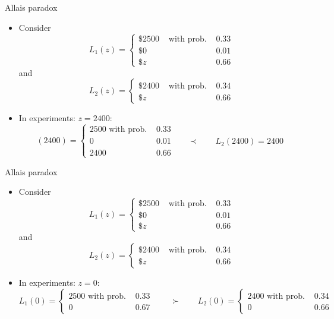 \begin{frame}[t]{Allais paradox}
\footnotesize
\begin{itemize}
\item Consider\[L_1(z)=\left\{\begin{array}{lll}\$ 2500 & \text { with prob. } & 0.33\\ \$0 & & 0.01 \\ \$ z & & 0.66\end{array}\right.\]
and
\[L_2(z)=\left\{\begin{array}{lll}\$ 2400 & \text { with prob. } & 0.34 \\ \$ z & & 0.66\end{array}\right.\]\medskip
\item In experiments: $z=2400$:
\[(2400)= \begin{cases} 2500 \text { with prob. } & 0.33 \\  0 & 0.01 \qquad\prec \qquad L_2(2400)=2400\\  2400 & 0.66\end{cases}
\]
\end{itemize}
\end{frame}

\begin{frame}[t]{Allais paradox}
\footnotesize
\begin{itemize}
\item Consider\[L_1(z)=\left\{\begin{array}{lll}\$ 2500 & \text { with prob. } & 0.33\\ \$0 & & 0.01 \\ \$ z & & 0.66\end{array}\right.\]
and
\[L_2(z)=\left\{\begin{array}{lll}\$ 2400 & \text { with prob. } & 0.34 \\ \$ z & & 0.66\end{array}\right.\]\medskip
\item In experiments: $z=0$:
\[L_1(0)= \begin{cases} 2500 \text { with prob. } & 0.33 \\ 0 & 0.67 \end{cases}\qquad \succ \qquad
L_2(0) = \begin{cases} 2400 \text { with prob. } & 0.34 \\ 0 & 0.66\end{cases}\]
\end{itemize}
\end{frame}



